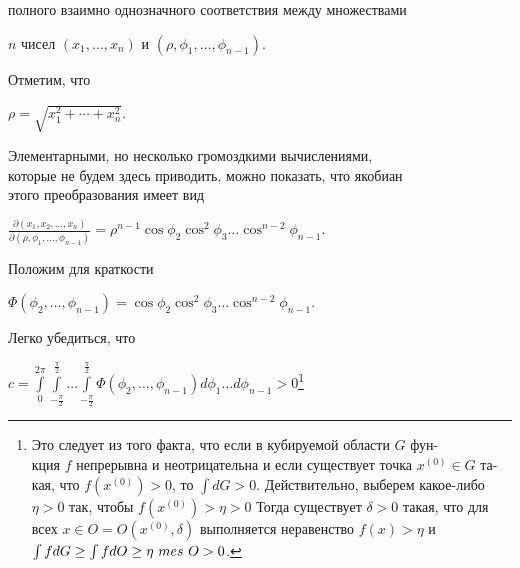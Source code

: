 ﻿\documentclass[twocolumn]{article}
\begin{document}
\makeatletter
\renewcommand{\@oddhead}{\textrm{\footnotesize\bf{154}}{\footnotesize\slshape{\hspace{115pt} \S\ 48. Несобственные кратные интегралы}}\hfil\textrm{\footnotesize\slshape{\hspace{10pt} 48.3. Несобственные интегралы функций, меняющих знак \hspace{60pt}}}{\footnotesize\bf{155 \hspace{40pt}}}}
\makeatother

{\raggedright полного взаимно однозначного соответствия между множествами

$n$ чисел $(x_1,\ldots,x_n)$ и $(\rho,\phi_1,\ldots,\phi_{n-1})$.
}

{\raggedright Отметим, что}
\begin{center}
$\rho = \sqrt{x_1^2+\cdots+x_n^2}$.
\end{center}
\hspace{5pt} Элементарными, но несколько громоздкими вычислениями,\\ которые не будем здесь приводить, можно показать, что якобиан\\ этого преобразования имеет вид
\begin{center}
$\frac{\partial(x_1,x_2,\ldots,x_n)}{\partial(\rho,\phi_1,\ldots,\phi_{n-1})} = \rho^{n-1}\cos{\phi_2}\cos^2{\phi_3}\ldots\cos^{n-2}{\phi_{n-1}}$.
\end{center}
\hspace{5pt} Положим для краткости
\begin{center}
$\Phi(\phi_2,\ldots,\phi_{n-1}) = \cos{\phi_2}\cos^2{\phi_3\ldots\cos^{n-2}{\phi_{n-1}}}$.
\end{center}
\hspace{5pt} Легко убедиться, что
\begin{center}
$c = \int\limits_0^{2\pi} \int\limits_{-\frac{\pi}{2}}^{\frac{\pi}{2}}\ldots\int\limits_{-\frac{\pi}{2}}^{\frac{\pi}{2}} \Phi(\phi_2,\ldots,\phi_{n-1})d\phi_1\ldots d\phi_{n-1} > 0$\renewcommand{\thefootnote}{*)}\footnote{%
Это следует из того факта, что если в кубируемой области $G$ фун-\\кция $f$ непрерывна и неотрицательна и если существует точка $x^{(0)}\in G$ та-\\кая, что $f(x^{(0)}) > 0$, то $\int dG > 0$. Действительно, выберем какое-либо\\ $\eta > 0$ так, чтобы $f(x^{(0)}) > \eta > 0$  Тогда существует $\delta > 0$ такая, что для\\ всех $x \in O = O(x^{(0)}, \delta)$ выполняется неравенство $f(x) > \eta$ и $\int fdG \geq \int fdO \\ \geq \eta\ mes\ O > 0$.}
\end{center}
\end{document}
